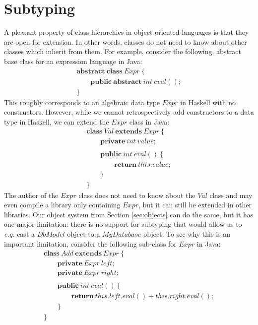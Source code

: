 \section{Subtyping}
\label{sec:encoding}

A pleasant property of class hierarchies in object-oriented languages is that they are open for extension. In other words, classes do not need to know about other classes which inherit from them. For example, consider the following, abstract base class for an expression language in Java:
\begin{displaymath}
\begin{array}{l}
\mathbf{abstract}~\mathbf{class}~\mathit{Expr}~\{\\
\qquad \mathbf{public}~\mathbf{abstract}~\mathit{int}~\mathit{eval}();\\
\}
\end{array}
\end{displaymath}
This roughly corresponds to an algebraic data type $\mathit{Expr}$ in Haskell with no constructors. However, while we cannot retrospectively add constructors to a data type in Haskell, we can extend the $\mathit{Expr}$ class in Java:
\begin{displaymath}
\begin{array}{l}
\mathbf{class}~\mathit{Val}~\mathbf{extends}~\mathit{Expr}~\{\\
\qquad \mathbf{private}~\mathit{int}~\mathit{value};\\\\
\qquad \mathbf{public}~\mathit{int}~\mathit{eval}()~\{\\
\qquad \qquad \mathbf{return}~\mathit{this}.\mathit{value};\\
\qquad \}\\
\}
\end{array}
\end{displaymath}
The author of the $\mathit{Expr}$ class does not need to know about the $\mathit{Val}$ class and may even compile a library only containing $\mathit{Expr}$, but it can still be extended in other libraries. Our object system from Section \ref{sec:objects} can do the same, but it has one major limitation: there is no support for subtyping that would allow us to \emph{e.g.} cast a $\mathit{DbModel}$ object to a $\mathit{MyDatabase}$ object. To see why this is an important limitation, consider the following sub-class for $\mathit{Expr}$ in Java:
\begin{displaymath}
\begin{array}{l}
\mathbf{class}~\mathit{Add}~\mathbf{extends}~\mathit{Expr}~\{\\
\qquad \mathbf{private}~\mathit{Expr}~\mathit{left};\\
\qquad \mathbf{private}~\mathit{Expr}~\mathit{right};\\\\
\qquad \mathbf{public}~\mathit{int}~\mathit{eval}()~\{\\
\qquad \qquad \mathbf{return}~\mathit{this}.\mathit{left}.\mathit{eval}() + \mathit{this}.\mathit{right}.\mathit{eval}();\\
\qquad \}\\
\}
\end{array}
\end{displaymath}
